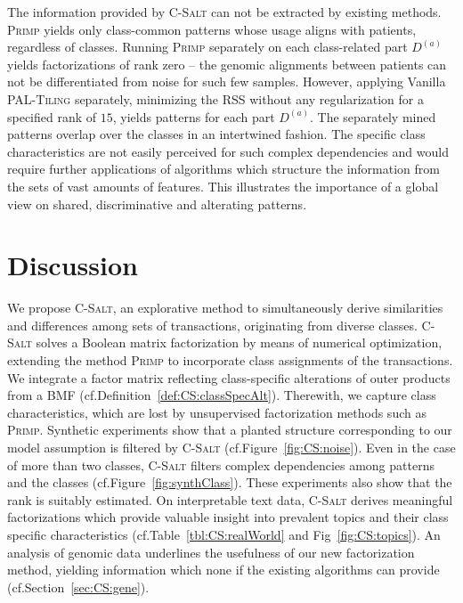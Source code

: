 The information provided by \textsc{C-Salt} can not be extracted by existing methods. \textsc{Primp} yields only class-common patterns whose usage aligns with patients, regardless of classes. Running \textsc{Primp} separately on each class-related part $D^{(a)}$ yields factorizations of rank zero -- the genomic alignments between patients can not be differentiated from noise for such few samples.  
However, applying Vanilla \textsc{PAL-Tiling} separately, minimizing the RSS without any regularization for a specified rank of $15$, yields patterns for each part $D^{(a)}$. The separately mined patterns overlap over the classes in an intertwined fashion. The specific class characteristics are not easily perceived for such complex dependencies and would require further applications of algorithms which structure the information from the sets of vast amounts of features. This illustrates the importance of a global view on shared, discriminative and alterating patterns.
\section{Discussion}
We propose \textsc{C-Salt}, an explorative method to simultaneously derive similarities and differences among sets of transactions, originating from diverse classes. \textsc{C-Salt} solves a Boolean matrix factorization by means of numerical optimization, extending the method \textsc{Primp} to incorporate class assignments of the transactions. We integrate a factor matrix reflecting class-specific alterations of outer products from a BMF (cf.\@ Definition~\ref{def:CS:classSpecAlt}). Therewith, we capture class characteristics, which are lost by unsupervised factorization methods such as \textsc{Primp}. Synthetic experiments show that a planted structure corresponding to our model assumption is filtered by \textsc{C-Salt} (cf.\@ Figure~\ref{fig:CS:noise}). Even in the case of more than two classes, \textsc{C-Salt} filters complex dependencies among patterns and the classes (cf.\@ Figure~\ref{fig:synthClass}). These experiments also show that the rank is suitably estimated. On interpretable text data, \textsc{C-Salt} derives meaningful factorizations which provide valuable insight into prevalent topics and their class specific characteristics (cf.\@ Table~\ref{tbl:CS:realWorld} and Fig~\ref{fig:CS:topics}). An analysis of genomic data underlines the usefulness of our new factorization method, yielding information which none if the existing algorithms can provide (cf.\@ Section~\ref{sec:CS:gene}).
